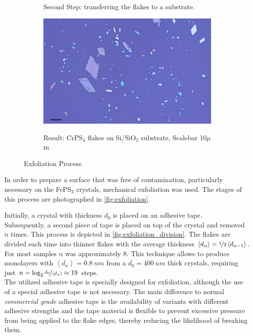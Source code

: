 \documentclass[
	oneside,
	parskip=half,
	a4paper,
]{scrbook}
\begin{document}
\begin{figure}[h]
\begin{subfigure}[c]{.3\textwidth}
		\caption{Second Step: transferring the flakes to a substrate.}
		\label{fig:exfoliation_transfer}
	\end{subfigure}
	\begin{subfigure}[c]{.3\textwidth}
		\includegraphics[width=\textwidth]{../../data/2023-12-04_LO_MG_NiPS3/CrPS4_50x_10um.png}\\
		\caption{Result: CrPS$_\text{4}$ flakes on Si/SiO$_\text{2}$ substrate, Scalebar 10$\mu$m}
		\label{fig:exfoliation_result}
	\end{subfigure}
	\caption{Exfoliation Process.}
	\label{fig:exfoliation}
\end{figure}
In order to prepare a surface that was free of contamination, particularly necessary on the FePS$_3$ crystals, mechanical exfoliation was used.
The stages of this process are photographed in \autoref{fig:exfoliation}.

Initially, a crystal with thickness $d_0$ is placed on an adhesive tape.\\
Subsequently, a second piece of tape is placed on top of the crystal and removed $n$ times.
This process is depicted in \autoref{fig:exfoliation_division}.
The flakes are divided each time into thinner flakes with the average thickness $\left< d_{n} \right> = \nicefrac{1}{2} \left< d_{n-1} \right>$.\\
For most samples $n$ was approximately $8$.
This technique allows to produce monolayers with $ \left<d_n\right>  = \SI{0.8}{nm}$ \cite{NiPS3_few_layer} from a $d_0 = \SI{400}{um}$ thick crystals, requiring just $n = \log_2 \nicefrac{d_0}{\left<d_n\right>} \approx 19$ steps.\\
The utilized adhesive tape is specially designed for exfoliation, although the use of a special adhesive tape is not necessary.
The main difference to normal \textit{commercial grade} adhesive tape is the availability of variants with different adhesive strengths 
and the tape material is flexible to prevent excessive pressure from being applied to the flake edges, thereby reducing the likelihood of breaking them.
\end{document}
